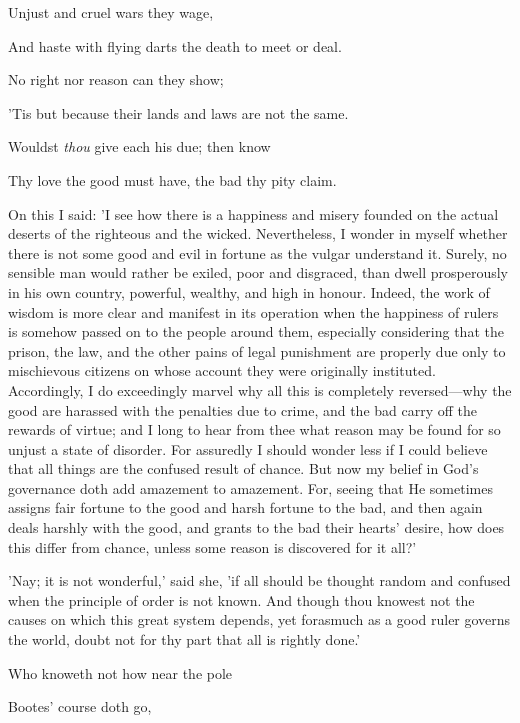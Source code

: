 Unjust and cruel wars they wage,

And haste with flying darts the death to meet or deal.

No right nor reason can they show;

'Tis but because their lands and laws are not the same.

Wouldst \emph{thou} give each his due; then know

Thy love the good must have, the bad thy pity claim.


On this I said: 'I see how there is a happiness and misery founded on
the actual deserts of the righteous and the wicked. Nevertheless, I
wonder in myself whether there is not some good and evil in fortune as
the vulgar understand it. Surely, no sensible man would rather be
exiled, poor and disgraced, than dwell prosperously in his own country,
powerful, wealthy, and high in honour. Indeed, the work of wisdom is
more clear and manifest in its operation when the happiness of rulers is
somehow passed on to the people around them, especially considering that
the prison, the law, and the other pains of legal punishment are
properly due only to mischievous citizens on whose account they were
originally instituted. Accordingly, I do exceedingly marvel why all this
is completely reversed—why the good are harassed with the penalties due
to crime, and the bad carry off the rewards of virtue; and I long to
hear from thee what reason may be found for so unjust a state of
disorder. For assuredly I should wonder less if I could believe that all
things are the confused result of chance. But now my belief in God's
governance doth add amazement to amazement. For, seeing that He
sometimes assigns fair fortune to the good and harsh fortune to the bad,
and then again deals harshly with the good, and grants to the bad their
hearts' desire, how does this differ from chance, unless some reason is
discovered for it all?'

'Nay; it is not wonderful,' said she, 'if all should be thought random
and confused when the principle of order is not known. And though thou
knowest not the causes on which this great system depends, yet forasmuch
as a good ruler governs the world, doubt not for thy part that all is
rightly done.'


Who knoweth not how near the pole

Bootes' course doth go,

